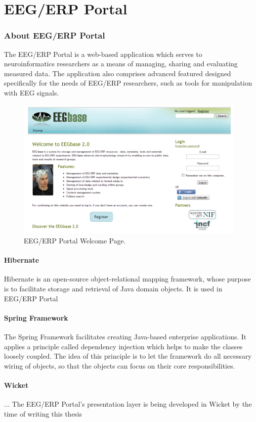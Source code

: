 \chapter{EEG/ERP Portal}


\subsection{About EEG/ERP Portal}

The EEG/ERP Portal is a web-based application which serves to neuroinformatics researchers as a means of managing, sharing and evaluating measured data. The application also comprises advanced featured designed specifically for the needs of EEG/ERP researchers, such as tools for manipulation with EEG signals.


\begin{figure}
	\centering
		\includegraphics[width=1.00\textwidth]{figures/eegPortal.png}
	\caption{EEG/ERP Portal Welcome Page.}
	\label{fig:eegPortal}
\end{figure}


\subsubsection*{Hibernate}

Hibernate \cite{Hibernate:Home} is an open-source object-relational mapping framework, whose purpose is to facilitate storage and retrieval of Java domain objects. It is used in EEG/ERP Portal

\subsubsection*{Spring Framework}

The Spring Framework facilitates creating Java-based enterprise applications. It applies a principle called dependency injection which helps to make the classes loosely coupled. The idea of this principle is to let the framework do all necessary wiring of objects, so that the objects can focus on their core responsibilities. 

\subsubsection*{Wicket}
... The EEG/ERP Portal's presentation layer is being developed in Wicket by the time of writing this thesis 

